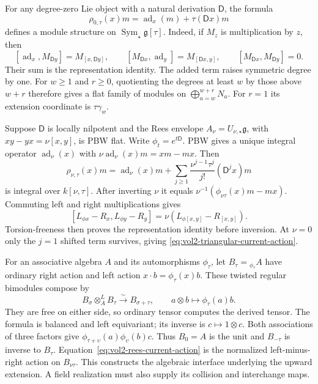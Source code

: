 For any degree-zero Lie object with a natural derivation $\mathsf D$,
the formula
\begin{equation}\label{eq:vol2-triangular-current-action}
 \rho_{0,\tau}(x)m=\operatorname{ad}_x(m)+\tau(\mathsf Dx)m
\end{equation}
defines a module structure on $\operatorname{Sym}_\star\mathfrak g[\tau]$.
Indeed, if $M_z$ is multiplication by $z$, then
\[
 [\operatorname{ad}_x,M_{\mathsf Dy}]=M_{[x,\mathsf Dy]},\qquad
 [M_{\mathsf Dx},\operatorname{ad}_y]=M_{[\mathsf Dx,y]},\qquad
 [M_{\mathsf Dx},M_{\mathsf Dy}]=0.
\]
Their sum is the representation identity. The added term raises
symmetric degree by one. For $w\geq1$ and $r\geq0$, quotienting
the degrees at least $w$ by
those above $w+r$ therefore gives a flat family of modules on
$\bigoplus_{a=w}^{w+r}N_a$. For $r=1$ its extension coordinate is
$\tau\gamma_w$.

Suppose $\mathsf D$ is locally nilpotent and the Rees envelope
$A_\nu=U_{\nu,\star}\mathfrak g$, with
$xy-yx=\nu[x,y]$, is PBW flat. Write $\phi_t=e^{t\mathsf D}$.
PBW gives a unique integral operator $\operatorname{ad}_\nu(x)$
with $\nu\operatorname{ad}_\nu(x)m=xm-mx$. Then
\begin{equation}\label{eq:vol2-rees-current-action}
 \rho_{\nu,\tau}(x)m
 =\operatorname{ad}_\nu(x)m+
   \sum_{j\geq1}\frac{\nu^{j-1}\tau^j}{j!}(\mathsf D^jx)m
\end{equation}
is integral over $k[\nu,\tau]$. After inverting $\nu$ it equals
$\nu^{-1}(\phi_{\nu\tau}(x)m-mx)$.
Commuting left and right multiplications gives
\[
 [L_{\phi x}-R_x,L_{\phi y}-R_y]
   =\nu(L_{\phi[x,y]}-R_{[x,y]}).
\]
Torsion-freeness then proves the representation identity before
inversion. At $\nu=0$ only the $j=1$ shifted term survives, giving
\eqref{eq:vol2-triangular-current-action}.

For an associative algebra $A$ and its automorphisms $\phi_\tau$,
let $B_\tau={}_{\phi_\tau}A$ have ordinary right action and left
action $x\cdot b=\phi_\tau(x)b$. These twisted regular bimodules
compose by
\begin{equation}\label{eq:vol2-interface-composition}
 B_\sigma\otimes_A^L B_\tau\xrightarrow{\sim}B_{\sigma+\tau},
 \qquad a\otimes b\longmapsto\phi_\tau(a)b.
\end{equation}
They are free on either side, so ordinary tensor computes the
derived tensor. The formula is balanced and left equivariant;
its inverse is $c\mapsto1\otimes c$. Both associations of three
factors give $\phi_{\tau+\upsilon}(a)\phi_\upsilon(b)c$.
Thus $B_0=A$ is the unit and $B_{-\tau}$ is inverse to $B_\tau$.
Equation~\eqref{eq:vol2-rees-current-action} is the normalized
left-minus-right action on $B_{\nu\tau}$. This constructs the
algebraic interface underlying the upward extension. A field
realization must also supply its collision and interchange maps.

